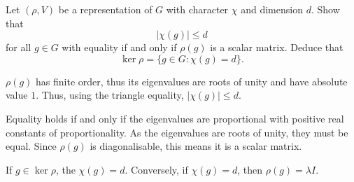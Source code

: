 \question Let $(\rho, V)$ be a representation of $G$ with character $\chi$ and dimension $d$. Show that
\[ \lvert \chi(g) \rvert \leq d \]
for all $g \in G$ with equality if and only if $\rho(g)$ is a scalar matrix. Deduce that
\[ \ker\rho = \{g \in G: \chi(g) = d\}. \]
\begin{solution}
    $\rho(g)$ has finite order, thus its eigenvalues are roots of unity and have absolute value $1$. Thus, using the triangle equality, $\lvert \chi(g) \rvert \leq d$. 
    
    Equality holds if and only if the eigenvalues are proportional with positive real constants of proportionality. As the eigenvalues are roots of unity, they must be equal. Since $\rho(g)$ is diagonalisable, this means it is a scalar matrix. 
    
    If $g \in \ker\rho$, the $\chi(g) = d$. Conversely, if $\chi(g) = d$, then $\rho(g) = \lambda I$.
\end{solution}